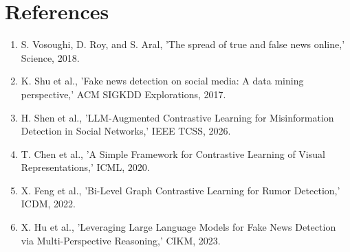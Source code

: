 \documentclass[12pt,a4paper]{report}
\begin{document}
\chapter*{References}
\begin{enumerate}
\item S. Vosoughi, D. Roy, and S. Aral, 'The spread of true and false news online,' Science, 2018.
\item K. Shu et al., 'Fake news detection on social media: A data mining perspective,' ACM SIGKDD Explorations, 2017.
\item H. Shen et al., 'LLM-Augmented Contrastive Learning for Misinformation Detection in Social Networks,' IEEE TCSS, 2026.
\item T. Chen et al., 'A Simple Framework for Contrastive Learning of Visual Representations,' ICML, 2020.
\item X. Feng et al., 'Bi-Level Graph Contrastive Learning for Rumor Detection,' ICDM, 2022.
\item X. Hu et al., 'Leveraging Large Language Models for Fake News Detection via Multi-Perspective Reasoning,' CIKM, 2023.
\end{enumerate}
\end{document}
